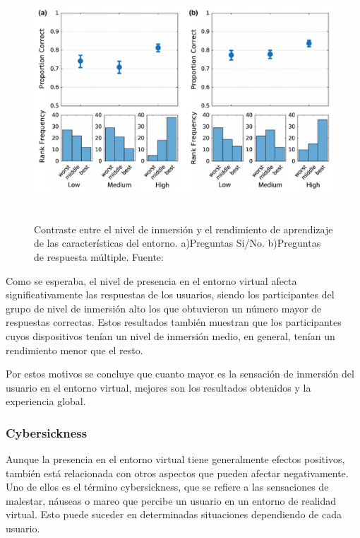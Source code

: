\documentclass[../main.tex]{subfiles}
\begin{document}
\begin{figure}[h!]
\centering
\includegraphics[height=9cm, width=13cm]{imagenes/Immersion_Experiment.png}
\caption{Contraste entre el nivel de inmersión y el rendimiento de aprendizaje de las características del entorno. a)Preguntas Si/No. b)Preguntas de respuesta múltiple. Fuente:\cite{Immersion_Experiment}}
\label{fig:Immersion_Experiment}
\end{figure}

Como se esperaba, el nivel de presencia en el entorno virtual afecta significativamente las respuestas de los usuarios, siendo los participantes del grupo de nivel de inmersión alto los que obtuvieron un número mayor de respuestas correctas. Estos resultados también muestran que los participantes cuyos dispositivos tenían un nivel de inmersión medio, en general, tenían un rendimiento menor que el resto.

Por estos motivos se concluye que cuanto mayor es la sensación de inmersión del usuario en el entorno virtual, mejores son los resultados obtenidos y la experiencia global.

\subsubsection{Cybersickness}

Aunque la presencia en el entorno virtual tiene generalmente efectos positivos, también está relacionada con otros aspectos que pueden afectar negativamente. Uno de ellos es el término cybersickness, que se refiere a las sensaciones de malestar, náuseas o mareo que percibe un usuario en un entorno de realidad virtual. Esto puede suceder en determinadas situaciones dependiendo de cada usuario.
\end{document}
